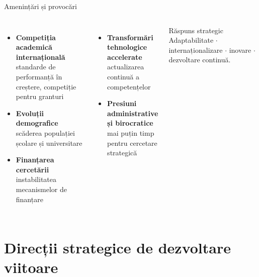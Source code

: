 \documentclass[11pt,aspectratio=169]{beamer}
\newcommand{\sub}[1]{{\small\textcolor{dark!70}{#1}}}
\begin{document}
\begin{frame}{\faBolt\; Amenințări și provocări}
\vspace{0.5em}
\begin{columns}[T,onlytextwidth]
\footnotesize
\begin{itemize}\setlength\itemsep{0.7em}
  \item \textcolor{gold!60!black}{\faTrophy}\; \textbf{Competiția academică internațională}\\ \sub{standarde de performanță în creștere, competiție pentru granturi}
  \item \textcolor{gold!60!black}{\faUsers}\; \textbf{Evoluții demografice}\\ \sub{scăderea populației școlare și universitare}
  \item \textcolor{gold!60!black}{\faCoins}\; \textbf{Finanțarea cercetării}\\ \sub{instabilitatea mecanismelor de finanțare}
\end{itemize}
\footnotesize
\begin{itemize}\setlength\itemsep{0.7em}
  \item \textcolor{gold!60!black}{\faLaptopCode}\; \textbf{Transformări tehnologice accelerate}\\ \sub{actualizarea continuă a competențelor}
  \item \textcolor{gold!60!black}{\faFileSignature}\; \textbf{Presiuni administrative și birocratice}\\ \sub{mai puțin timp pentru cercetare strategică}
\end{itemize}
\vspace{0.4em}
\begin{alertblock}{\faBullseye\; Răspuns strategic}
\footnotesize Adaptabilitate $\cdot$ internaționalizare $\cdot$ inovare $\cdot$ dezvoltare continuă.
\end{alertblock}
\end{columns}
\end{frame}

\section{Direcții strategice de dezvoltare viitoare}
\end{document}
